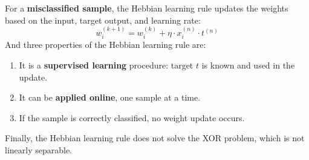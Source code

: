 \begin{takeawaysbox}
    For a \textbf{misclassified sample}, the Hebbian learning rule updates the weights based on the input, target output, and learning rate:
    \begin{equation*}
        w_{i}^{(k+1)} = w_i^{(k)} + \eta \cdot x_i^{(n)} \cdot t^{(n)}
    \end{equation*}
    And three properties of the Hebbian learning rule are:
    \begin{enumerate}
        \item It is a \textbf{supervised learning} procedure: target $t$ is known and used in the update.
        \item It can be \textbf{applied online}, one sample at a time.
        \item If the sample is correctly classified, no weight update occurs.
    \end{enumerate}
    Finally, the Hebbian learning rule does not solve the XOR problem, which is not linearly separable.
\end{takeawaysbox}

\newpage

